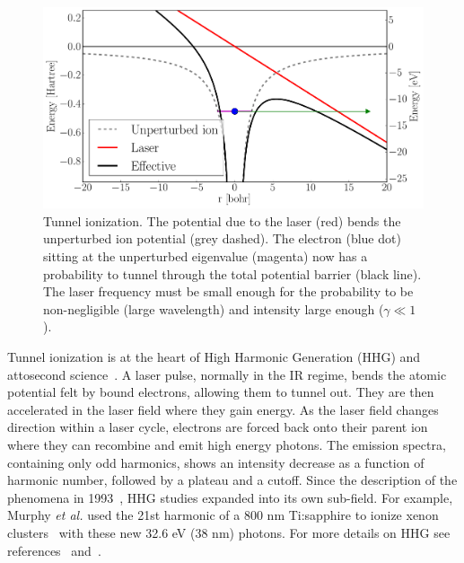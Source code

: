 \begin{figure}
 \centering
 \includegraphics[width=\figurewidth]{figures/ionization_tunnel}
 \caption{\label{fig:ionization:tunnel}Tunnel ionization. The potential
          due to the laser (red) bends the unperturbed ion potential
          (grey dashed). The electron (blue dot) sitting at the unperturbed
          eigenvalue (magenta) now has a probability to tunnel through the total
          potential barrier (black line). The laser frequency must be small
          enough for the probability to be non-negligible (large wavelength)
          and intensity large enough ($\gamma \ll 1$).}
\end{figure}

Tunnel ionization is at the heart of High Harmonic Generation (HHG) and
attosecond science~\cite{Fennel2010}. A laser pulse, normally in the IR regime,
bends the atomic potential felt by bound electrons, allowing them to tunnel
out. They are then accelerated in the laser field where they gain energy.
As the laser field changes direction within a laser cycle, electrons are forced
back onto their parent ion where they can
recombine and emit high energy photons. The emission spectra,
containing only odd harmonics, shows an intensity decrease as a function of
harmonic number, followed by a plateau and a cutoff. Since the description
of the phenomena in 1993~\cite{Corkum1993}, HHG studies expanded into its own
sub-field. For example, Murphy \textit{et al.} used the 21st harmonic of a
800 nm Ti:sapphire to ionize xenon clusters~\cite{Murphy2008a,Murphy2008b}
with these new 32.6 eV (38 nm) photons.
For more details on HHG see references~\cite{Levesque2006}
and~\cite{Lewenstein2008}.


